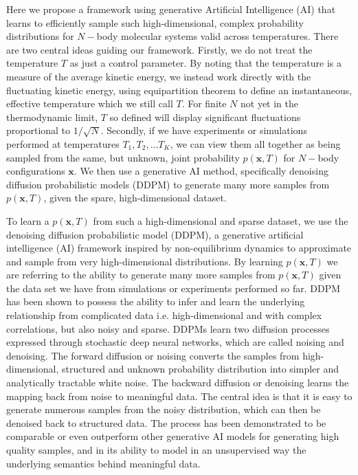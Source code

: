 \documentclass[9pt,twocolumn,twoside]{pnas-new}
\begin{document}
Here we propose a framework using generative Artificial Intelligence (AI) that learns to efficiently sample such high-dimensional, complex probability distributions for $N-$body molecular systems valid across temperatures. There are two central ideas guiding our framework. Firstly, we do not treat the temperature $T$ as just a control parameter. By noting that the temperature is a measure of the average kinetic energy, we instead work directly with the fluctuating kinetic energy, using equipartition theorem to define an instantaneous, effective temperature which we still call $T$. For finite $N$ not yet in the thermodynamic limit, $T$ so defined will display significant fluctuations proportional to ${1 / \sqrt{N}}$. Secondly, if we have experiments or simulations performed at temperatures $T_1, T_2,...T_K$, we can view them all together as being sampled from the same, but unknown, joint probability $p(\mathbf{x},T)$ for $N-$body configurations $\mathbf{x}$. We then use a generative AI method, specifically denoising diffusion probabilistic models (DDPM)\cite{DPM,denoising} to generate many more samples from $p(\mathbf{x},T)$, given the spare, high-dimensional dataset.


To learn a $p(\mathbf{x},T)$ from such a high-dimensional and sparse dataset, we use the denoising diffusion probabilistic model (DDPM),\cite{DPM,denoising} a generative artificial intelligence (AI) framework inspired by non-equilibrium dynamics to approximate and sample from very high-dimensional distributions. By learning $p(\mathbf{x},T)$ we are referring to the ability to generate many more samples from $p(\mathbf{x},T)$ given the data set we have from simulations or experiments performed so far.  DDPM has been shown to possess the ability to infer and learn the underlying relationship from complicated data i.e. high-dimensional and with complex correlations, but also noisy and sparse\cite{DPM,denoising}. DDPMs learn two diffusion processes expressed through stochastic deep neural networks, which are called noising and denoising. The forward diffusion or noising converts the samples from high-dimensional, structured and unknown probability distribution into simpler and analytically tractable white noise. The backward diffusion or denoising learns the mapping back from noise to meaningful data. The central idea is that it is easy to generate numerous samples from the noisy distribution, which can then be denoised back to structured data. The process has been demonstrated to be comparable or even outperform other generative AI models for generating high quality samples, and in its ability to model in an unsupervised way the underlying semantics behind meaningful data.\cite{DPM, denoising}
\end{document}
